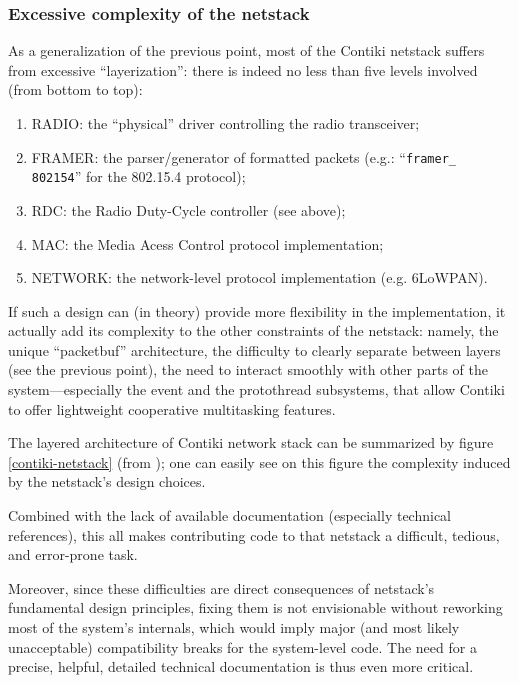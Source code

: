 \documentclass[12pt,twoside,a4paper]{article}
\begin{document}

\subsubsection{Excessive complexity of the netstack}

As a generalization of the previous point, most of the Contiki netstack
suffers from excessive ``layerization'': there is indeed no less than five
levels involved (from bottom to top):
\begin{enumerate}
\item RADIO: the ``physical'' driver controlling the radio transceiver;
\item FRAMER: the parser/generator of formatted packets (e.g.:
              ``\texttt{framer\_ 802154}'' for the 802.15.4 protocol);
\item RDC: the Radio Duty-Cycle controller (see above);
\item MAC: the Media Acess Control protocol implementation;
\item NETWORK: the network-level protocol implementation (e.g. 6LoWPAN).
\end{enumerate}

If such a design can (in theory) provide more flexibility in the
implementation, it actually add its complexity to the other
constraints of the netstack: namely, the unique ``packetbuf'' architecture,
the difficulty to clearly separate between layers (see the previous point),
the need to interact smoothly with other parts of the system---especially
the event and the protothread \cite{pt} subsystems, that allow Contiki
to offer lightweight cooperative multitasking features.

The layered architecture of Contiki network stack can be summarized
by figure \ref{contiki-netstack} (from \cite{judit-blog});
one can easily see on this figure the complexity induced by
the netstack's design choices.

Combined with the lack of available documentation (especially technical
references), this all makes contributing code to that netstack a difficult,
tedious, and error-prone task.

Moreover, since these difficulties are direct consequences of netstack's
fundamental design principles, fixing them is not envisionable without
reworking most of the system's internals, which would imply major (and
most likely unacceptable) compatibility breaks for the system-level code.
The need for a precise, helpful, detailed technical documentation is thus
even more critical.
\end{document}

